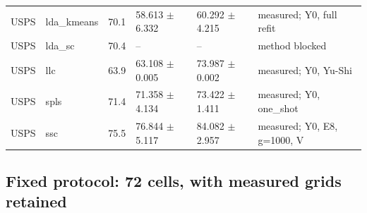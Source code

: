 \begin{longtable}{llrllp{2.9cm}}
USPS & lda\_kmeans & 70.1 & 58.613 $\pm$ 6.332 & 60.292 $\pm$ 4.215 & measured; Y0, full refit \\
USPS & lda\_sc & 70.4 & -- & -- & method blocked \\
USPS & llc & 63.9 & 63.108 $\pm$ 0.005 & 73.987 $\pm$ 0.002 & measured; Y0, Yu-Shi \\
USPS & spls & 71.4 & 71.358 $\pm$ 4.134 & 73.422 $\pm$ 1.411 & measured; Y0, one\_shot \\
USPS & ssc & 75.5 & 76.844 $\pm$ 5.117 & 84.082 $\pm$ 2.957 & measured; Y0, E8, g=1000, V \\
\bottomrule\end{longtable}
\subsection{Fixed protocol: 72 cells, with measured grids retained}
